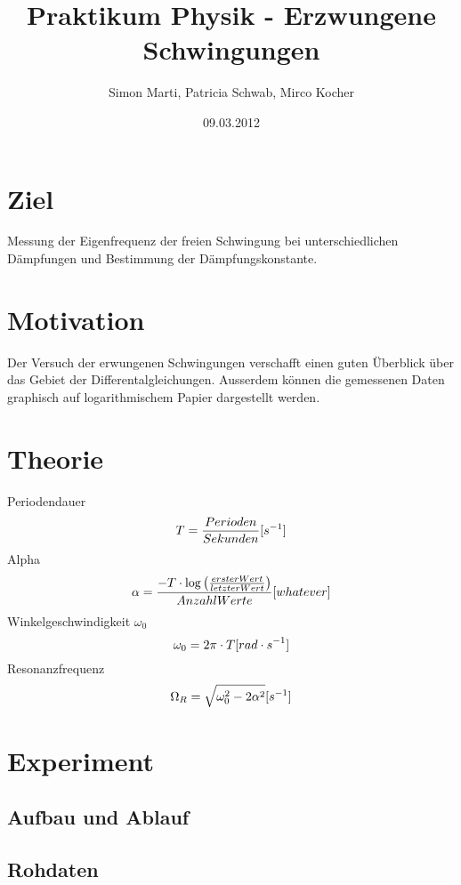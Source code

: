 \documentclass[12pt,a4paper]{article}
\title{Praktikum Physik - Erzwungene Schwingungen}
\author{Simon Marti, Patricia Schwab, Mirco Kocher}
\date{09.03.2012}
\begin{document}
\maketitle

\section*{Ziel}
Messung der Eigenfrequenz der freien Schwingung bei unterschiedlichen D\"ampfungen und Bestimmung der D\"ampfungskonstante.

\section*{Motivation}
Der Versuch der erwungenen Schwingungen verschafft einen guten \"Uberblick \"uber das Gebiet der Differentalgleichungen. Ausserdem k\"onnen die gemessenen Daten graphisch auf logarithmischem Papier dargestellt werden. 

\section*{Theorie}
Periodendauer
\begin{equation}
T = \frac{Perioden}{Sekunden} \mbox [{s}^{-1}]
\end{equation}
Alpha
\begin{equation}
\alpha = \frac{-T\cdot\log\left( \frac{erster Wert}{letzter Wert}\right)}{Anzahl Werte} \mbox [{whatever}]
\end{equation}
Winkelgeschwindigkeit $\omega_0$
\begin{equation}
\omega_0 = 2\pi \cdot T \mbox[{rad \cdot s}^{-1}]
\end{equation}
Resonanzfrequenz
\begin{equation}
\Omega_R = \sqrt{\omega_0^2 - 2\alpha^2} \mbox [{s}^{-1}]
\end{equation}

\newpage

\section*{Experiment}

\subsection*{Aufbau und Ablauf}

\subsection*{Rohdaten}
\end{document}
